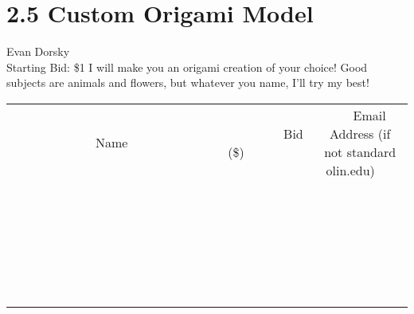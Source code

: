 \documentclass[11pt]{article}
\begin{document}
\section*{2.5 Custom Origami Model}
Evan Dorsky
\\
Starting Bid: \$1
\newline
I will make you an origami creation of your choice! Good subjects are animals and flowers, but whatever you name, I'll try my best!
\\[6ex]
\begin{tabular}{c c c}
~~~~~~~~~~~~~Name~~~~~~~~~~~~~ & ~~~~~~~~~Bid (\$)~~~~~~~~~  & ~~~Email Address (if not standard olin.edu)~~~\\
 & & \\
\hline
 & & \\
\hline
 & & \\
\hline
 & & \\
\hline
 & & \\
\hline
 & & \\
\hline
 & & \\
\hline
 & & \\
\hline
 & & \\
\hline
 & & \\
\hline
 & & \\
\hline
 & & \\
\hline
 & & \\
\hline
 & & \\
\hline
 & & \\
\hline
 & & \\
\hline
 & & \\
\hline
 & & \\
\hline
 & & \\
\hline
 & & \\
\hline
 & & \\
\hline
 & & \\
\hline
 & & \\
\hline
 & & \\
\hline
 & & \\
\hline
 & & \\
\hline
\end{tabular}
\newpage
\end{document}
